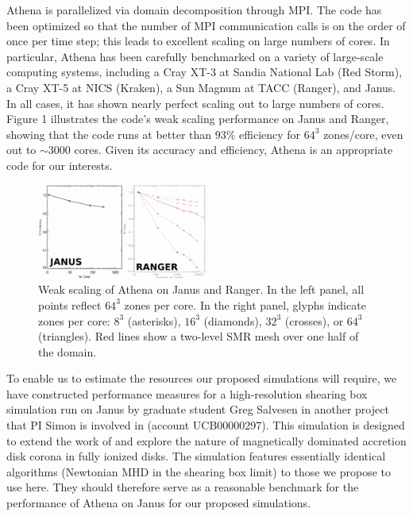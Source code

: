 \documentclass[preprint]{aastex}
\begin{document}
{\sc Athena} is parallelized via domain decomposition through MPI.  The code has been optimized so that the number of MPI communication calls is on the order of once per time step; this leads to excellent scaling on large numbers of cores.  In particular, {\sc Athena} has been carefully benchmarked on a variety of large-scale computing systems, including a Cray XT-3 at Sandia National Lab ({\sc Red Storm}), a Cray XT-5 at NICS ({\sc Kraken}), a Sun Magnum at TACC ({\sc Ranger}), and {\sc Janus}. In all cases, it has shown nearly perfect scaling out to large numbers of cores. Figure 1 illustrates the code's weak scaling performance on {\sc Janus} and {\sc Ranger}, showing that the code runs at better than $93\%$ efficiency for $64^3$ zones/core, even out to $\sim 3000$ cores. Given its accuracy and efficiency, {\sc Athena} is an appropriate code for our interests.

\begin{figure}
\vspace{-0.3cm}
\begin{center}
\includegraphics[width=0.5\textwidth]{merged_scaling.pdf}
\vspace{-0.3cm}
\caption{{\footnotesize Weak scaling of {\sc Athena} on {\sc Janus} and {\sc Ranger}.  In the left panel, all points reflect $64^3$ zones per core.  In the right panel, glyphs indicate zones per core: $8^3$ (asterisks), $16^3$ (diamonds), $32^3$ (crosses), or $64^3$ (triangles).  Red lines show a two-level SMR mesh over one half of the domain.}}
\end{center}
\vspace{-0.6cm}
\label{fig:janusscaling}
\end{figure}

To enable us to estimate the resources our proposed simulations will require, we have constructed performance measures for a high-resolution shearing box simulation run on {\sc Janus} by graduate student Greg Salvesen
in another project that PI Simon is involved in (account UCB00000297). This simulation is designed to extend the work of \cite{simon12} and explore the nature of magnetically dominated accretion disk corona in fully ionized disks. The simulation features essentially identical algorithms (Newtonian MHD in the shearing box limit) to those we propose to use here. They should therefore serve as a reasonable benchmark for the performance of {\sc Athena} on {\sc Janus} for our proposed simulations.
\end{document}
